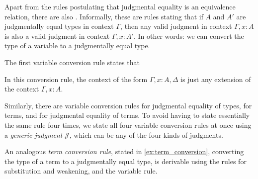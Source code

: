 \bigskip
Apart from the rules postulating that judgmental equality is an equivalence relation, there are also .
Informally, these are rules stating that if $A$ and $A'$ are judgmentally equal types in context $\Gamma$, then any valid judgment in context $\Gamma,x:A$ is also a valid judgment in context $\Gamma,x:A'$. In other words: we can convert the type of a variable to a judgmentally equal type.

The first variable conversion rule states that
\begin{prooftree}
\end{prooftree}
In this conversion rule, the context of the form $\Gamma,x:A,\Delta$ is just any extension of the context $\Gamma,x:A$.

Similarly, there are variable conversion rules for judgmental equality of types, for terms, and for judgmental equality of terms. To avoid having to state essentially the same rule four times, we state all four variable conversion rules at once using a \emph{generic judgment} $\mathcal{J}$, which can be any of the four kinds of judgments.
\begin{prooftree}
\end{prooftree}
An analogous \emph{term conversion rule}, stated in \cref{ex:term_conversion}, converting the type of a term to a judgmentally equal type, is derivable using the rules for substitution and weakening, and the variable rule.

